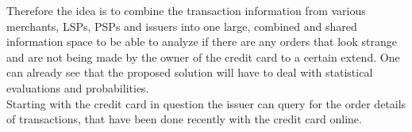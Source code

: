 Therefore the idea is to combine the transaction information from various merchants, \gls{LSP}s, \gls{PSP}s and issuers into one large, combined and shared information space to be able to analyze if there are any orders that look strange and are not being made by the owner of the credit card to a certain extend. One can already see that the proposed solution will have to deal with statistical evaluations and probabilities. \\

Starting with the credit card in question the issuer can query for the order details of transactions, that have been done recently with the credit card online.

